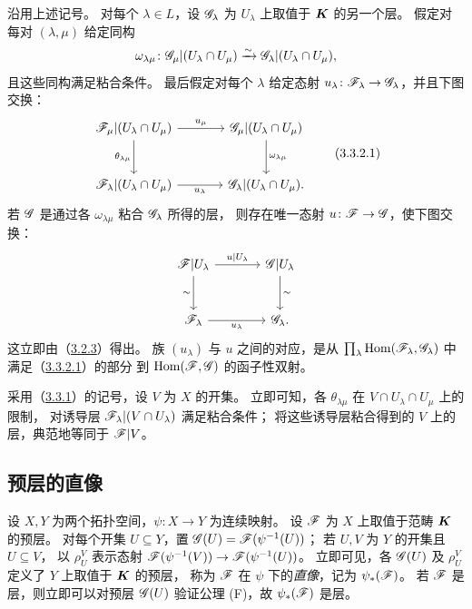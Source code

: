 沿用上述记号。
对每个 $\lambda\in L$，设 $\mathscr G_\lambda$ 为 $U_\lambda$ 上取值于 $\boldsymbol K$ 的另一个层。
假定对每对 $(\lambda,\mu)$ 给定同构
\[
 \omega_{\lambda\mu}\colon
 \mathscr G_\mu|(U_\lambda\cap U_\mu)
 \xrightarrow{\sim}\mathscr G_\lambda|(U_\lambda\cap U_\mu),
\]
且这些同构满足粘合条件。
最后假定对每个 $\lambda$ 给定态射 $u_\lambda\colon\mathscr F_\lambda\to\mathscr G_\lambda$，并且下图交换：
\begin{equation}
\begin{tikzcd}[column sep=large,row sep=large]
\F_\mu|(U_\lambda\cap U_\mu)
 \arrow[r,"u_\mu"] \arrow[d,"\theta_{\lambda\mu}"']
 &\G_\mu|(U_\lambda\cap U_\mu) \arrow[d,"\omega_{\lambda\mu}"]\\
\F_\lambda|(U_\lambda\cap U_\mu)
 \arrow[r,"u_\lambda"'] &\G_\lambda|(U_\lambda\cap U_\mu).
\end{tikzcd}
\tag{3.3.2.1}\label{eq:0:3.3.2.1}
\end{equation}
若 $\mathscr G$ 是通过各 $\omega_{\lambda\mu}$ 粘合 $\mathscr G_\lambda$ 所得的层，
则存在唯一态射 $u\colon\mathscr F\to\mathscr G$，使下图交换：
\[
\begin{tikzcd}[column sep=large,row sep=large]
 \F|U_\lambda \arrow[r,"u|U_\lambda"] \arrow[d,"\sim"']
 & \G|U_\lambda \arrow[d,"\sim"]\\
 \F_\lambda \arrow[r,"u_\lambda"'] & \G_\lambda.
\end{tikzcd}
\]
这立即由（\hyperlink{para:0:3.2.3}{3.2.3}）得出。
族 $(u_\lambda)$ 与 $u$ 之间的对应，是从
$\prod_\lambda\operatorname{Hom}(\mathscr F_\lambda,\mathscr G_\lambda)$ 中满足（\hyperref[eq:0:3.3.2.1]{3.3.2.1}）的部分
到 $\operatorname{Hom}(\mathscr F,\mathscr G)$ 的函子性双射。

采用（\hyperlink{para:0:3.3.1}{3.3.1}）的记号，设 $V$ 为 $X$ 的开集。
立即可知，各 $\theta_{\lambda\mu}$ 在 $V\cap U_\lambda\cap U_\mu$ 上的限制，
对诱导层 $\mathscr F_\lambda|(V\cap U_\lambda)$ 满足粘合条件；
将这些诱导层粘合得到的 $V$ 上的层，典范地等同于 $\mathscr F|V$。

\subsection{预层的直像}\hypertarget{heading:0:3.4}{}

设 $X,Y$ 为两个拓扑空间，$\psi\colon X\to Y$ 为连续映射。
设 $\mathscr F$ 为 $X$ 上取值于范畴 $\boldsymbol K$ 的预层。
对每个开集 $U\subseteq Y$，置 $\mathscr G(U)=\mathscr F(\psi^{-1}(U))$；
若 $U,V$ 为 $Y$ 的开集且 $U\subseteq V$，
以 $\rho_U^V$ 表示态射 $\mathscr F(\psi^{-1}(V))\to\mathscr F(\psi^{-1}(U))$。
立即可见，各 $\mathscr G(U)$ 及 $\rho_U^V$ 定义了 $Y$ 上取值于 $\boldsymbol K$ 的预层，
称为 $\mathscr F$ 在 $\psi$ 下的\emph{直像}，记为 $\psi_*(\mathscr F)$。
若 $\mathscr F$ 是层，则立即可以对预层 $\mathscr G(U)$ 验证公理 (F)，故 $\psi_*(\mathscr F)$ 是层。

